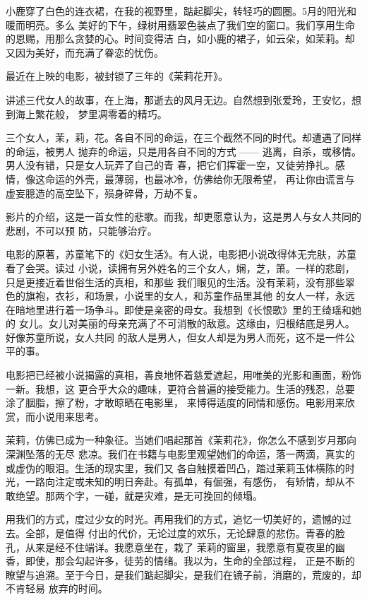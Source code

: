 		小鹿穿了白色的连衣裙，在我的视野里，踮起脚尖，转轻巧的圆圈。5月的阳光和暖而明亮。多么
	美好的下午，绿树用翡翠色装点了我们空的窗口。我们享用生命的恩赐，用那么贪婪的心。时间变得洁
	白，如小鹿的裙子，如云朵，如茉莉。却又因为美好，而充满了眷恋的忧伤。

		最近在上映的电影，被封锁了三年的《茉莉花开》。

		讲述三代女人的故事，在上海，那逝去的风月无边。自然想到张爱玲，王安忆，想到海上繁花般，
	梦里凋零着的精巧。

		三个女人，茉，莉，花。各自不同的命运，在三个截然不同的时代。却遭遇了同样的命运，被男人
	抛弃的命运，只是用各自不同的方式 —— 逃离，自杀，或移情。男人没有错，只是女人玩弄了自己的青
	春，把它们挥霍一空，又徒劳挣扎。感情，像这命运的外壳，最薄弱，也最冰冷，仿佛给你无限希望，
	再让你由谎言与虚妄臆造的高空坠下，殒身碎骨，万劫不复。

		影片的介绍，这是一首女性的悲歌。而我，却更愿意认为，这是男人与女人共同的悲剧，不可以预
	防，只能够治疗。

		电影的原著，苏童笔下的《妇女生活》。有人说，电影把小说改得体无完肤，苏童看了会哭。读过
	小说，读拥有另外姓名的三个女人，娴，芝，箫。一样的悲剧，只是更接近着世俗生活的真相，和那些
	我们眼见的生活。没有茉莉，没有那些翠色的旗袍，衣衫，和场景，小说里的女人，和苏童作品里其他
	的女人一样，永远在暗地里进行着一场争斗。即使是亲密的母女。我想到《长恨歌》里的王绮瑶和她的
	女儿。女儿对美丽的母亲充满了不可消散的敌意。这缘由，归根结底是男人。好像苏童所说，女人共同
	的敌人是男人，但女人却是为男人而死，这不是一件公平的事。

		电影把已经被小说揭露的真相，善良地怀着慈爱遮起，用唯美的光影和画面，粉饰一新。我想，这
	更合乎大众的趣味，更符合普遍的接受能力。生活的残忍，总要涂了胭脂，擦了粉，才敢晾晒在电影里，
	来博得适度的同情和感伤。电影用来欣赏，而小说用来思考。

		茉莉，仿佛已成为一种象征。当她们唱起那首《茉莉花》，你怎么不感到岁月那向深渊坠落的无尽
	悲凉。我们在书籍与电影里观望她们的命运，落一两滴，真实的或虚伪的眼泪。生活的现实里，我们又
	各自触摸着凹凸，踏过茉莉玉体横陈的时光，一路向注定或未知的明日奔赴。有孤单，有倔强，有感伤，
	有矫情，却从不敢绝望。那两个字，一碰，就是灾难，是无可挽回的倾塌。


		用我们的方式，度过少女的时光。再用我们的方式，追忆一切美好的，遗憾的过去。全部，是值得
	付出的代价，无论过度的欢乐，无论肆意的悲伤。青春的脸孔，从来是经不住端详。我愿意坐在，栽了
	茉莉的窗里，我愿意有夏夜里的幽香，即使，那会勾起许多，徒劳的情绪。我以为，生命的全部过程，
	正是不断的瞭望与追溯。至于今日，是我们踮起脚尖，是我们在镜子前，消磨的，荒废的，却不肯轻易
	放弃的时间。

